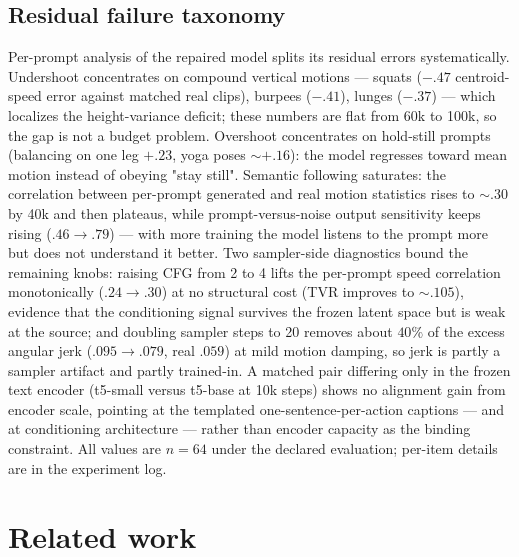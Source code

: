 \documentclass[10pt,twocolumn]{article}
\begin{document}
\subsection{Residual failure taxonomy}
Per-prompt analysis of the repaired model splits its
residual errors systematically. Undershoot concentrates on compound vertical motions — squats ($-.47$ centroid-speed
error against matched real clips), burpees ($-.41$), lunges ($-.37$) — which localizes the height-variance deficit;
these numbers are flat from 60k to 100k, so the gap is not a budget problem. Overshoot concentrates on hold-still
prompts (balancing on one leg $+.23$, yoga poses ${\sim}{+}.16$): the model regresses toward mean motion instead of
obeying "stay still". Semantic following saturates: the correlation between per-prompt generated and real motion
statistics rises to ${\sim}.30$ by 40k and then plateaus, while prompt-versus-noise output sensitivity keeps rising
($.46{\to}.79$) — with more training the model listens to the prompt more but does not understand it better. Two
sampler-side diagnostics bound the remaining knobs: raising CFG from 2 to 4 lifts the per-prompt speed correlation
monotonically ($.24{\to}.30$) at no structural cost (TVR improves to ${\sim}.105$), evidence that the conditioning
signal survives the frozen latent space but is weak at the source; and doubling sampler steps to 20 removes about
$40\%$ of the excess angular jerk ($.095{\to}.079$, real $.059$) at mild motion damping, so jerk is partly a sampler
artifact and partly trained-in. A matched pair differing only in the frozen text encoder (t5-small versus t5-base at
10k steps) shows no alignment gain from encoder scale, pointing at the templated one-sentence-per-action captions —
and at conditioning architecture — rather than encoder capacity as the binding constraint. All values are $n{=}64$
under the declared evaluation; per-item details are in the experiment log.

\section{Related work}
\end{document}
